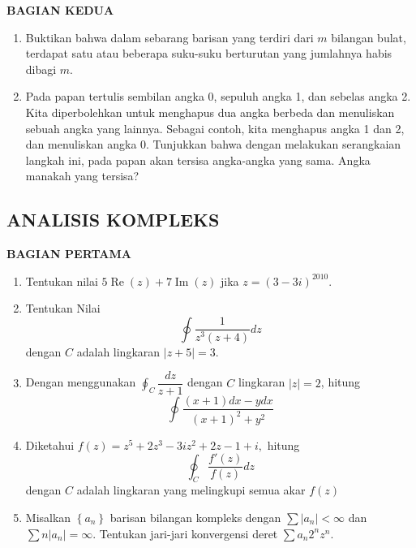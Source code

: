 \documentclass[12pt,twoside]{article}
\begin{document}
\newpage \textbf{BAGIAN KEDUA}
\begin{enumerate}
	\item Buktikan bahwa dalam sebarang barisan yang terdiri dari $m$ bilangan bulat, terdapat satu atau beberapa suku-suku berturutan yang jumlahnya habis dibagi $m$.

	\item Pada papan tertulis sembilan angka 0, sepuluh angka 1, dan sebelas angka 2. Kita diperbolehkan untuk menghapus dua angka berbeda dan menuliskan sebuah angka yang lainnya. Sebagai contoh, kita menghapus angka 1 dan 2, dan menuliskan angka 0. Tunjukkan bahwa dengan melakukan serangkaian langkah ini, pada papan akan tersisa angka-angka yang sama. Angka manakah yang tersisa?
\end{enumerate}

\newpage \subsection{ANALISIS KOMPLEKS}

\textbf{BAGIAN PERTAMA}

\begin{enumerate}
	\item Tentukan nilai $5\operatorname{Re}(z)+7\operatorname{Im}(z)$ jika $z = (3-3i)^{2010}$.

	\item Tentukan Nilai
	      \begin{equation*}
		      \oint \dfrac{1}{z^3(z+4)} dz
	      \end{equation*}
	      dengan $C$ adalah lingkaran $|z+5|=3$.

	\item Dengan menggunakan $\displaystyle\oint_C \dfrac{dz}{z+1} $ dengan $C$ lingkaran $|z|=2$, hitung
	      \begin{equation*}
		      \oint \dfrac{(x+1)dx-ydx}{(x+1)^2 + y^2}
	      \end{equation*}

	\item Diketahui $f(z)= z^5 +2z^3-3iz^2+2z-1+i,$ hitung
	      \begin{equation*}
		      \oint_C \dfrac{f'(z)}{f(z)} dz
	      \end{equation*}
	      dengan $C$ adalah lingkaran yang melingkupi semua akar $f(z)$

	\item Misalkan $\left\lbrace a_n \right\rbrace$ barisan bilangan kompleks dengan $\sum |a_n|< \infty $ dan $\sum n|a_n|=\infty $. Tentukan jari-jari konvergensi deret $\sum a_n2^nz^n$.

\end{enumerate}
\end{document}
